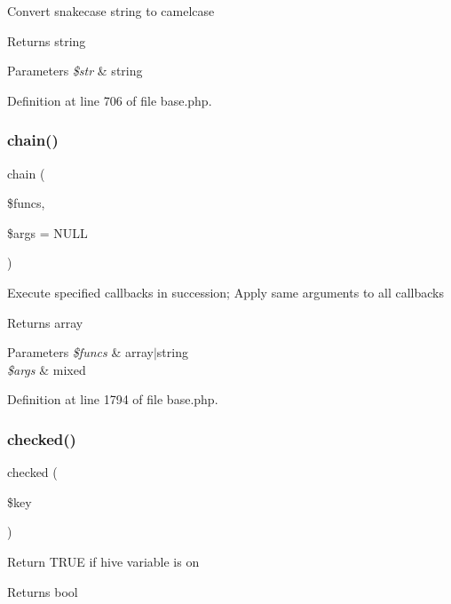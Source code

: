 Convert snakecase string to camelcase \begin{DoxyReturn}{Returns}
string 
\end{DoxyReturn}

\begin{DoxyParams}{Parameters}
{\em \$str} & string \\
\hline
\end{DoxyParams}


Definition at line 706 of file base.\+php.

\hypertarget{class_base_ab92ef3c41964ec3291278fefb47d16f5}{}\label{class_base_ab92ef3c41964ec3291278fefb47d16f5} 
\subsubsection{\texorpdfstring{chain()}{chain()}}
{\footnotesize\ttfamily chain (\begin{DoxyParamCaption}\item[{}]{\$funcs,  }\item[{}]{\$args = {\ttfamily NULL} }\end{DoxyParamCaption})}

Execute specified callbacks in succession; Apply same arguments to all callbacks \begin{DoxyReturn}{Returns}
array 
\end{DoxyReturn}

\begin{DoxyParams}{Parameters}
{\em \$funcs} & array$\vert$string \\
\hline
{\em \$args} & mixed \\
\hline
\end{DoxyParams}


Definition at line 1794 of file base.\+php.

\hypertarget{class_base_a1e33118c04d4a7df9336e02db8f8d663}{}\label{class_base_a1e33118c04d4a7df9336e02db8f8d663} 
\subsubsection{\texorpdfstring{checked()}{checked()}}
{\footnotesize\ttfamily checked (\begin{DoxyParamCaption}\item[{}]{\$key }\end{DoxyParamCaption})}

Return T\+R\+UE if hive variable is \textquotesingle{}on\textquotesingle{} \begin{DoxyReturn}{Returns}
bool 
\end{DoxyReturn}

